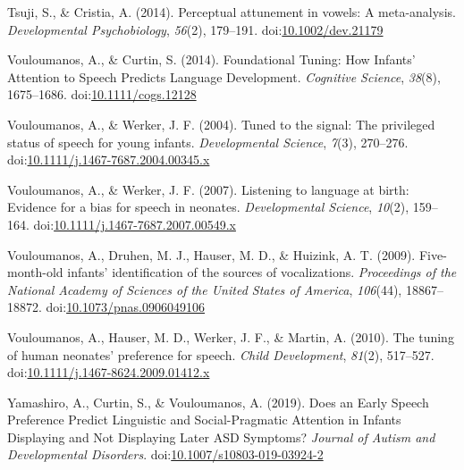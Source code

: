 \documentclass[man,floatsintext]{apa6}
\begin{document}
\hypertarget{ref-tsuji_perceptual_2014}{}
Tsuji, S., \& Cristia, A. (2014). Perceptual attunement in vowels: A
meta-analysis. \emph{Developmental Psychobiology}, \emph{56}(2),
179--191.
doi:\href{https://doi.org/10.1002/dev.21179}{10.1002/dev.21179}

\hypertarget{ref-vouloumanos_foundational_2014}{}
Vouloumanos, A., \& Curtin, S. (2014). Foundational Tuning: How Infants'
Attention to Speech Predicts Language Development. \emph{Cognitive
Science}, \emph{38}(8), 1675--1686.
doi:\href{https://doi.org/10.1111/cogs.12128}{10.1111/cogs.12128}

\hypertarget{ref-vouloumanos_tuned_2004}{}
Vouloumanos, A., \& Werker, J. F. (2004). Tuned to the signal: The
privileged status of speech for young infants. \emph{Developmental
Science}, \emph{7}(3), 270--276.
doi:\href{https://doi.org/10.1111/j.1467-7687.2004.00345.x}{10.1111/j.1467-7687.2004.00345.x}

\hypertarget{ref-vouloumanos_listening_2007}{}
Vouloumanos, A., \& Werker, J. F. (2007). Listening to language at
birth: Evidence for a bias for speech in neonates. \emph{Developmental
Science}, \emph{10}(2), 159--164.
doi:\href{https://doi.org/10.1111/j.1467-7687.2007.00549.x}{10.1111/j.1467-7687.2007.00549.x}

\hypertarget{ref-vouloumanos_five-month-old_2009}{}
Vouloumanos, A., Druhen, M. J., Hauser, M. D., \& Huizink, A. T. (2009).
Five-month-old infants' identification of the sources of vocalizations.
\emph{Proceedings of the National Academy of Sciences of the United
States of America}, \emph{106}(44), 18867--18872.
doi:\href{https://doi.org/10.1073/pnas.0906049106}{10.1073/pnas.0906049106}

\hypertarget{ref-vouloumanos_tuning_2010}{}
Vouloumanos, A., Hauser, M. D., Werker, J. F., \& Martin, A. (2010). The
tuning of human neonates' preference for speech. \emph{Child
Development}, \emph{81}(2), 517--527.
doi:\href{https://doi.org/10.1111/j.1467-8624.2009.01412.x}{10.1111/j.1467-8624.2009.01412.x}

\hypertarget{ref-yamashiro_does_2019}{}
Yamashiro, A., Curtin, S., \& Vouloumanos, A. (2019). Does an Early
Speech Preference Predict Linguistic and Social-Pragmatic Attention in
Infants Displaying and Not Displaying Later ASD Symptoms? \emph{Journal
of Autism and Developmental Disorders}.
doi:\href{https://doi.org/10.1007/s10803-019-03924-2}{10.1007/s10803-019-03924-2}

\endgroup
\end{document}
